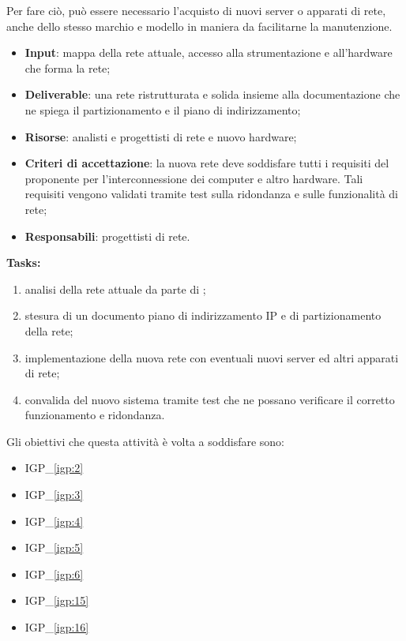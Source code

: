 		Per fare ciò, può essere necessario l'acquisto di nuovi server o apparati di rete, anche dello stesso marchio e modello in maniera da facilitarne la manutenzione.
	
		\begin{itemize}[noitemsep]
			\renewcommand\labelitemi{--}
			\item \textbf{Input}: mappa della rete attuale, accesso alla strumentazione e all'hardware che forma la rete;
			\item \textbf{Deliverable}: una rete ristrutturata e solida insieme alla documentazione che ne spiega il partizionamento e il piano di indirizzamento; 
			\item \textbf{Risorse}: analisti e progettisti di rete e nuovo hardware;
			\item \textbf{Criteri di accettazione}: la nuova rete deve soddisfare tutti i requisiti del proponente per l'interconnessione dei computer e altro hardware. Tali requisiti vengono validati tramite test sulla ridondanza e sulle funzionalità di rete;
			\item \textbf{Responsabili}: progettisti di rete.
		\end{itemize}
		
		\textbf{Tasks:}
		\begin{enumerate}[noitemsep]
			\item analisi della rete attuale da parte di \azienda;
			\item stesura di un documento piano di indirizzamento IP e di partizionamento della rete;
			\item implementazione della nuova rete con eventuali nuovi server ed altri apparati di rete;
			\item convalida del nuovo sistema tramite test che ne possano verificare il corretto funzionamento e ridondanza.
		\end{enumerate}

		Gli obiettivi che questa attività è volta a soddisfare sono:
		\begin{itemize}[noitemsep]
			\renewcommand\labelitemi{--}
			\item {\color{pantone}IGP\_\ref{igp:2}}
			\item {\color{pantone}IGP\_\ref{igp:3}}
			\item {\color{pantone}IGP\_\ref{igp:4}}
			\item {\color{pantone}IGP\_\ref{igp:5}}
			\item {\color{pantone}IGP\_\ref{igp:6}}
			\item {\color{pantone}IGP\_\ref{igp:15}}
			\item {\color{pantone}IGP\_\ref{igp:16}}
		\end{itemize}
	
